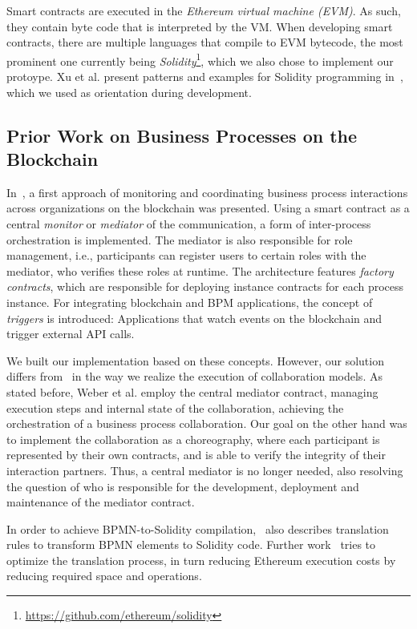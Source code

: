 \documentclass[runningheads]{llncs}
\begin{document}
Smart contracts are executed in the \emph{Ethereum virtual machine (EVM)}.
As such, they contain byte code that is interpreted by the VM.
When developing smart contracts, there are multiple languages that compile to EVM bytecode, the most prominent one currently being \emph{Solidity}\footnote{\url{https://github.com/ethereum/solidity}}, which we also chose to implement our protoype.
Xu et al. present patterns and examples for Solidity programming in~\cite{xu2018pattern}, which we used as orientation during development.

\subsection{Prior Work on Business Processes on the Blockchain}
In~\cite{weber2016untrusted}, a first approach of monitoring and coordinating business process interactions across organizations on the blockchain was presented.
Using a smart contract as a central \emph{monitor} or \emph{mediator} of the communication, a form of inter-process orchestration is implemented.
The mediator is also responsible for role management, i.e., participants can register users to certain roles with the mediator, who verifies these roles at runtime.
The architecture features \emph{factory contracts}, which are responsible for deploying instance contracts for each process instance.
For integrating blockchain and BPM applications, the concept of \emph{triggers} is introduced: Applications that watch events on the blockchain and trigger external API calls.

We built our implementation based on these concepts.
However, our solution differs from~\cite{weber2016untrusted} in the way we realize the execution of collaboration models.
As stated before, Weber et al. employ the central mediator contract, managing execution steps and internal state of the collaboration, achieving the orchestration of a business process collaboration.
Our goal on the other hand was to implement the collaboration as a choreography, where each participant is represented by their own contracts, and is able to verify the integrity of their interaction partners.
Thus, a central mediator is no longer needed, also resolving the question of who is responsible for the development, deployment and maintenance of the mediator contract.

In order to achieve BPMN-to-Solidity compilation,~\cite{weber2016untrusted} also describes translation rules to transform BPMN elements to Solidity code.
Further work~\cite{banuelos2017optimized} tries to optimize the translation process, in turn reducing Ethereum execution costs by reducing required space and operations.
\end{document}
